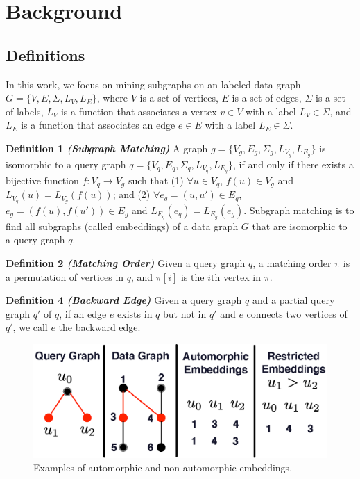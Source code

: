 \section{Background}
\subsection{Definitions}
In this work, we focus on mining subgraphs on an labeled data graph $G=\{V,E,\Sigma,L_V,L_E\}$, where $V$ is a set of vertices, $E$ is a set of edges, $\Sigma$ is a set of labels, $L_V$ is a function that associates a vertex $v \in V$ with a label $L_V \in \Sigma$, and $L_E$ is a function that associates an edge $e \in E$ with a label $L_E \in \Sigma$.

\noindent
\textbf{Definition 1 \emph{(Subgraph Matching)}} A graph $g=\{V_g,E_g,\Sigma_g,L_{V_g},L_{E_g}\}$ is isomorphic to a query graph $q=\{V_q,E_q,\Sigma_q,L_{V_q},L_{E_q}\}$, if and only if there exists a bijective function $f: V_q \rightarrow V_g$ such that (1) $\forall u \in V_q$, $f(u) \in V_g$ and $L_{V_q}(u) = L_{V_g}(f(u))$; and (2) $\forall e_q=(u,u') \in E_q$, $e_g=(f(u),f(u')) \in E_g$ and $L_{E_q}(e_q)=L_{E_g}(e_g)$. Subgraph matching is to find all subgraphs (called embeddings) of a data graph $G$ that are isomorphic to a query graph $q$.

\noindent
\textbf{Definition 2 \emph{(Matching Order)}} Given a query graph $q$, a matching order $\pi$ is a permutation of vertices in $q$, and $\pi[i]$ is the $i$th vertex in $\pi$.

\noindent
{}

\noindent
\textbf{Definition 4 \emph{(Backward Edge)}} Given a query graph $q$ and a partial query graph $q'$ of $q$, if an edge $e$ exists in $q$ but not in $q'$ and $e$ connects two vertices of $q'$, we call $e$ the backward edge.

\begin{figure}
\centering
\includegraphics[width=\columnwidth]{./figure/automorphism.eps}
\caption{Examples of automorphic and non-automorphic embeddings.}	
\label{fig:automo}
\end{figure}

